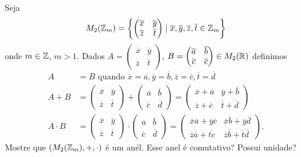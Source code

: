 \documentclass[12pt]{exam}
\begin{document}
    \questao{} Seja
    \[
        M_2(\mathbb{Z}_m) = \left\{\begin{pmatrix}
            \overline{x} & \overline{y}\\\overline{z} & \overline{t}
        \end{pmatrix} \mid \overline{x}, \overline{y}, \overline{z}, \overline{t} \in \mathbb{Z}_m \right\}
    \]
    onde $m \in \mathbb{Z}$, $m > 1$.
    Dados $A = \begin{pmatrix}
            \overline{x} & \overline{y}\\\overline{z} & \overline{t}
        \end{pmatrix}$, $B = \begin{pmatrix}
            \overline{a} & \overline{b}\\\overline{c} & \overline{c}
        \end{pmatrix} \in M_2(\mathbb{R})$ definimos
    \begin{align*}
        A &= B \mbox{ quando } \overline{x} = \overline{a}, \overline{y} = \overline{b}, \overline{z} = \overline{c}, \overline{t} = \overline{d}\\
        A + B &= \begin{pmatrix}
            \overline{x}& \overline{y}\\\overline{z} &\overline{t}
        \end{pmatrix} + \begin{pmatrix}
            \overline{a} & \overline{b}\\\overline{c} & \overline{d}
        \end{pmatrix} = \begin{pmatrix}
            \overline{x}+ \overline{a} & \overline{y} + \overline{b}\\\overline{z} + \overline{c} &\overline{t} + \overline{d}
        \end{pmatrix}\\
        A \cdot B &= \begin{pmatrix}
            \overline{x}& \overline{y}\\\overline{z} &\overline{t}
        \end{pmatrix} \cdot \begin{pmatrix}
            \overline{a} & \overline{b}\\\overline{c} & \overline{d}
        \end{pmatrix} = \begin{pmatrix}
            \overline{x}\overline{a} + \overline{y}\overline{c} & \overline{x}\overline{b} + \overline{y}\overline{d}\\\overline{z}\overline{a} + \overline{tc} & \overline{z}\overline{b} + \overline{t}\overline{d}
        \end{pmatrix}.
    \end{align*}
    Mostre que $(M_2(\mathbb{Z}_m), + , \cdot)$ \'e um an\'el. Esse anel \'e comutativo? Possui unidade?
\end{document}
